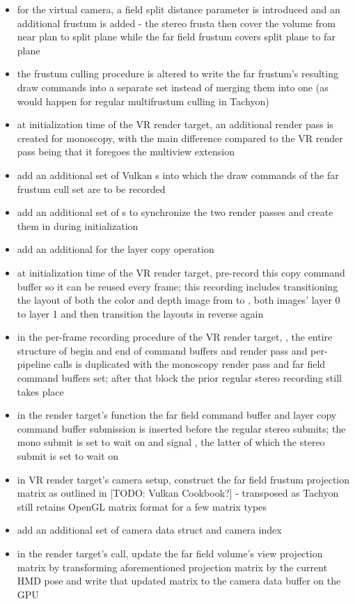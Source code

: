 \begin{itemize}
\item for the virtual camera, a field split distance parameter is introduced and an additional frustum is added - the stereo frusta then cover the volume from near plan to split plane while the far field frustum covers split plane to far plane
\item the frustum culling procedure is altered to write the far frustum's resulting draw commands into a separate set instead of merging them into one (as would happen for regular multifrustum culling in Tachyon)
\item at initialization time of the VR render target, an additional render pass is created for monoscopy, with the main difference compared to the VR render pass being that it foregoes the multiview extension
\item add an additional set of Vulkan s into which the draw commands of the far frustum cull set are to be recorded
\item add an additional set of s to synchronize the two render passes and create them in  during initialization
\item add an additional  for the layer copy operation
\item at initialization time of the VR render target, pre-record this copy command buffer so it can be reused every frame; this recording includes transitioning the layout of both the color and depth image from  to ,  both images' layer 0 to layer 1 and then transition the layouts in reverse again
\item in the per-frame recording procedure of the VR render target, , the entire structure of begin and end of command buffers and render pass and per-pipeline  calls is duplicated with the monoscopy render pass and far field command buffers set; after that block the prior regular stereo recording still takes place
\item in the render target's  function the far field command buffer and layer copy command buffer submission is inserted before the regular stereo submits; the mono submit is set to wait on  and signal , the latter of which the stereo submit is set to wait on
\item in VR render target's camera setup, construct the far field frustum projection matrix as outlined in [TODO: Vulkan Cookbook?] - transposed as Tachyon still retains OpenGL matrix format for a few matrix types
\item add an additional set of camera data struct and camera index
\item in the render target's  call, update the far field volume's view projection matrix by transforming aforementioned projection matrix by the current HMD pose and write that updated matrix to the camera data buffer on the GPU
\end{itemize}
